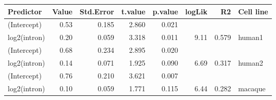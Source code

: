 \begin{table}[ht]
\centering
\begin{tabular}{lrrrrrrl}
  \hline
Predictor & Value & Std.Error & t.value & p.value & logLik & R2 & Cell line \\ 
  \hline
(Intercept) & 0.53 & 0.185 & 2.860 & 0.021 &  &  &  \\ 
  log2(intron) & 0.20 & 0.059 & 3.318 & 0.011 & 9.11 & 0.579 & human1 \\ 
   \hline
(Intercept) & 0.68 & 0.234 & 2.895 & 0.020 &  &  &  \\ 
  log2(intron) & 0.14 & 0.071 & 1.925 & 0.090 & 6.69 & 0.317 & human2 \\ 
   \hline
(Intercept) & 0.76 & 0.210 & 3.621 & 0.007 &  &  &  \\ 
  log2(intron) & 0.10 & 0.059 & 1.771 & 0.115 & 6.44 & 0.282 & macaque \\ 
   \hline
\end{tabular}
\end{table}
